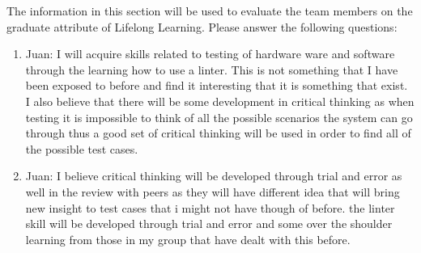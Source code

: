 \documentclass[12pt, titlepage]{article}
\begin{document}
The information in this section will be used to evaluate the team members on the
graduate attribute of Lifelong Learning.  Please answer the following questions:

\begin{enumerate}
  \item Juan: I will acquire skills related to testing of hardware ware and software through the learning
   how to use a linter. This is not something that I have been exposed to before and find it interesting 
   that it is something that exist. I also believe that there will be some development in critical thinking 
   as when testing it is impossible to think of all the possible scenarios the system can go through thus 
   a good set of critical thinking will be used in order to find all of the possible test cases.

  \item Juan: I believe critical thinking will be developed through trial and error as well in the review
   with peers as they will have different idea that will bring new insight to test cases that i might not 
   have though of before. the linter skill will be developed through trial and error and some over the shoulder
    learning from those in my group that have dealt with this before.

 
\end{enumerate}
\end{document}
